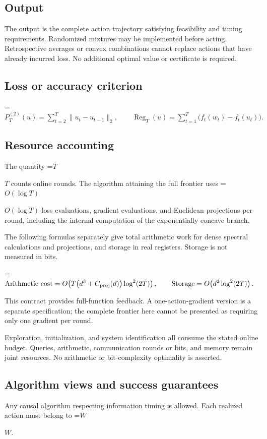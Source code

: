 \documentclass[10pt,a4paper]{article}
\newcommand{\AtlasMath}[1]{\par\begingroup\centering\setbox0=\hbox{$\displaystyle #1$}\ifdim\wd0>1.4\linewidth\typeout{ATLAS WIDE FORMULA: \the\wd0}\fi\ifdim\wd0>\linewidth\resizebox{\linewidth}{!}{\box0}\else\box0\fi\par\endgroup}
\newcommand{\AtlasInlineMath}[1]{\begingroup\setbox0=\hbox{$#1$}\ifdim\wd0>.4\linewidth\endgroup\AtlasMath{#1}\else\endgroup$#1$\fi}
\begin{document}
\subsection{Output}
The output is the complete action trajectory satisfying feasibility and timing requirements. Randomized mixtures may be implemented before acting. Retrospective averages or convex combinations cannot replace actions that have already incurred loss. No additional optimal value or certificate is required.

\subsection{Loss or accuracy criterion}

\AtlasMath{P_T^{(2)}(u)=\sum_{t=2}^{T}\|u_t-u_{t-1}\|_2,\qquad \operatorname{Reg}_T(u)=\sum_{t=1}^{T}\bigl(f_t(w_t)-f_t(u_t)\bigr).}


\subsection{Resource accounting}
The quantity \AtlasInlineMath{T} counts online rounds. The algorithm attaining the full frontier uses \AtlasInlineMath{O(\log T)} loss evaluations, gradient evaluations, and Euclidean projections per round, including the internal computation of the exponentially concave branch.

The following formulas separately give total arithmetic work for dense spectral calculations and projections, and storage in real registers. Storage is not measured in bits.


\AtlasMath{\text{Arithmetic cost}=O\!\left(T\bigl(d^3+C_{\rm proj}(d)\bigr)\log^2(2T)\right),\qquad \text{Storage}=O\!\left(d^2\log^2(2T)\right).}


This contract provides full-function feedback. A one-action-gradient version is a separate specification; the complete frontier here cannot be presented as requiring only one gradient per round.

Exploration, initialization, and system identification all consume the stated online budget. Queries, arithmetic, communication rounds or bits, and memory remain joint resources. No arithmetic or bit-complexity optimality is asserted.

\subsection{Algorithm views and success guarantees}
Any causal algorithm respecting information timing is allowed. Each realized action must belong to \AtlasInlineMath{W}.
\end{document}
